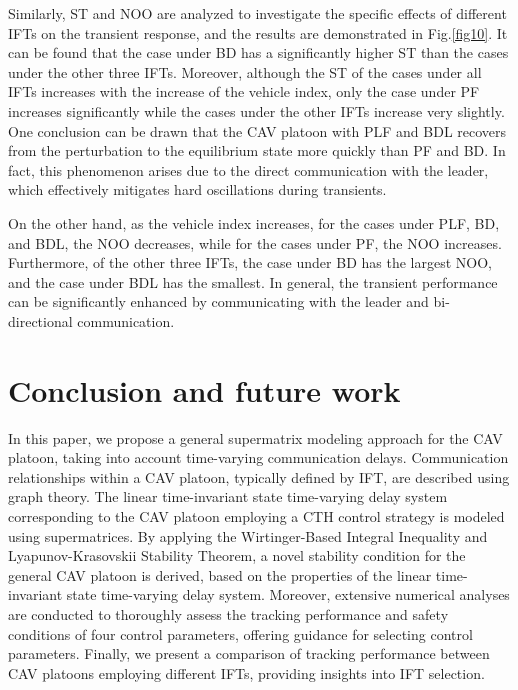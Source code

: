 \documentclass[journal]{IEEEtran}
\begin{document}
Similarly, ST and NOO are analyzed to investigate the specific effects of different IFTs on the transient response, and the results are demonstrated in Fig.\ref{fig10}. It can be found that the case under BD has a significantly higher ST than the cases under the other three IFTs. Moreover, although the ST of the cases under all IFTs increases with the increase of the vehicle index, only the case under PF increases significantly while the cases under the other IFTs increase very slightly. One conclusion can be drawn that the CAV platoon with PLF and BDL recovers from the perturbation to the equilibrium state more quickly than PF and BD. In fact, this phenomenon arises due to the direct communication with the leader, which effectively mitigates hard oscillations during transients.


On the other hand, as the vehicle index increases, for the cases under PLF, BD, and BDL, the NOO decreases, while for the cases under PF, the NOO increases. Furthermore, of the other three IFTs, the case under BD has the largest NOO, and the case under BDL has the smallest. In general, the transient performance can be significantly enhanced by communicating with the leader and bi-directional communication.



\section{Conclusion and future work}
\label{Section 6}

In this paper, we propose a general supermatrix modeling approach for the CAV platoon, taking into account time-varying communication delays. Communication relationships within a CAV platoon, typically defined by IFT, are described using graph theory. The linear time-invariant state time-varying delay system corresponding to the CAV platoon employing a CTH control strategy is modeled using supermatrices. By applying the Wirtinger-Based Integral Inequality and Lyapunov-Krasovskii Stability Theorem, a novel stability condition for the general CAV platoon is derived, based on the properties of the linear time-invariant state time-varying delay system. Moreover, extensive numerical analyses are conducted to thoroughly assess the tracking performance and safety conditions of four control parameters, offering guidance for selecting control parameters. Finally, we present a comparison of tracking performance between CAV platoons employing different IFTs, providing insights into IFT selection.
\end{document}
